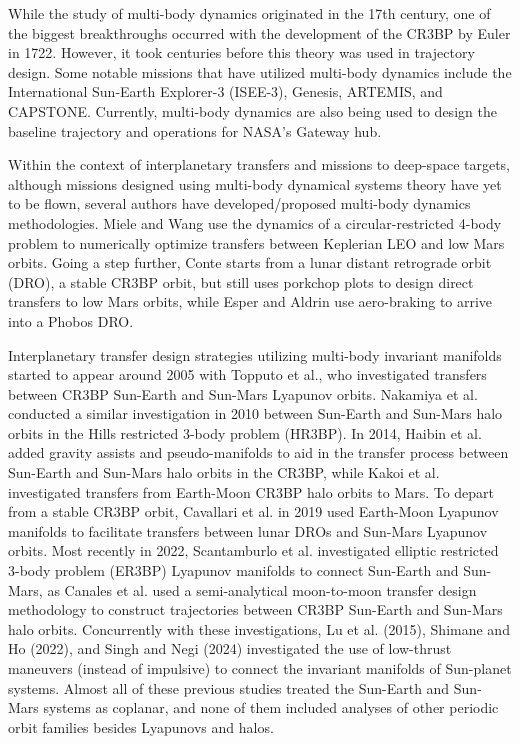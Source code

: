 While the study of multi-body dynamics originated in the 17th century, one of the biggest
breakthroughs occurred with the development of the CR3BP by Euler in 1722\cite{BarrowGreen:1997}.
However, it took centuries before this theory was used in trajectory design. Some notable missions
that have utilized multi-body dynamics include the International Sun-Earth Explorer-3
(ISEE-3)\cite{Farquhar:1984}, Genesis\cite{Lo:2001}, ARTEMIS\cite{Woodard:2009}, and
CAPSTONE\cite{Cheetham:2021}. Currently, multi-body dynamics are also being used to design the
baseline trajectory and operations for NASA's Gateway
hub\cite{Zamora:2024,Boudad:2022,ZimovanSpreen:2022}.

Within the context of interplanetary transfers and missions to deep-space targets, although
missions designed using multi-body dynamical systems theory have yet to be flown, several authors
have developed/proposed multi-body dynamics methodologies. Miele and Wang use the dynamics of a
circular-restricted 4-body problem to numerically optimize transfers between Keplerian LEO and low
Mars orbits\cite{Miele:1999}. Going a step further, Conte starts from a lunar distant retrograde
orbit (DRO), a stable CR3BP orbit, but still uses porkchop plots to design direct transfers to low
Mars orbits\cite{Conte:2017}, while Esper and Aldrin use aero-braking to arrive into a Phobos
DRO\cite{Esper:2019}.

Interplanetary transfer design strategies utilizing multi-body invariant manifolds started to
appear around 2005 with Topputo et al., who investigated transfers between CR3BP Sun-Earth and
Sun-Mars Lyapunov orbits\cite{Topputo:2005}. Nakamiya et al. conducted a similar investigation in
2010 between Sun-Earth and Sun-Mars halo orbits in the Hills restricted 3-body problem
(HR3BP)\cite{Nakamiya:2010}. In 2014, Haibin et al. added gravity assists and pseudo-manifolds to
aid in the transfer process between Sun-Earth and Sun-Mars halo orbits in the
CR3BP\cite{Haibin:2014}, while Kakoi et al. investigated transfers from Earth-Moon CR3BP halo
orbits to Mars\cite{Kakoi:2014}. To depart from a stable CR3BP orbit, Cavallari et al. in 2019 used
Earth-Moon Lyapunov manifolds to facilitate transfers between lunar DROs and Sun-Mars Lyapunov
orbits\cite{Cavallari:2019}. Most recently in 2022, Scantamburlo et al. investigated elliptic
restricted 3-body problem (ER3BP) Lyapunov manifolds to connect Sun-Earth and
Sun-Mars\cite{Scantamburlo:2022}, as Canales et al. used a semi-analytical moon-to-moon transfer
design methodology to construct trajectories between CR3BP Sun-Earth and Sun-Mars halo
orbits\cite{Canales:2022}. Concurrently with these investigations, Lu et al. (2015)\cite{Lu:2015},
Shimane and Ho (2022)\cite{Shimane:2022}, and Singh and Negi (2024)\cite{Singh:2024} investigated
the use of low-thrust maneuvers (instead of impulsive) to connect the invariant manifolds of
Sun-planet systems\cite{Lu:2015,Shimane:2022}. Almost all of these previous studies treated the
Sun-Earth and Sun-Mars systems as coplanar, and none of them included analyses of other periodic
orbit families besides Lyapunovs and halos.

